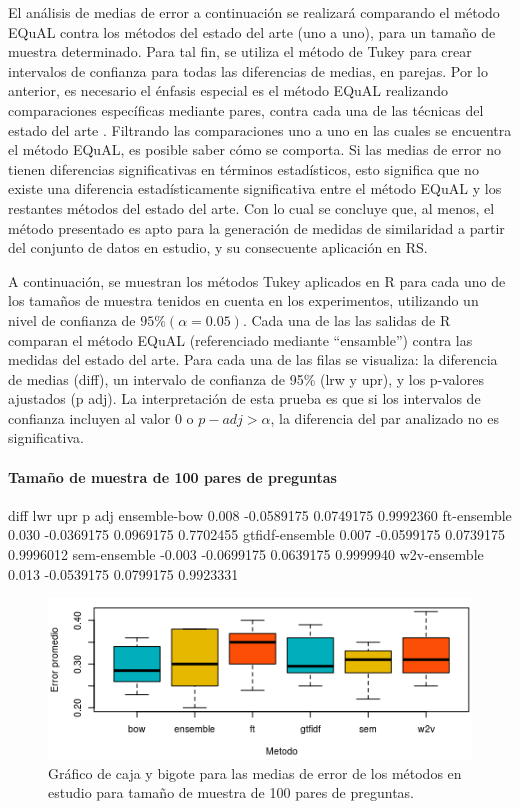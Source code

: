 \bigskip El análisis de medias de error a continuación se realizará comparando el método EQuAL contra los métodos del estado del arte (uno a uno), para un tamaño de muestra determinado. Para tal fin, se utiliza el método de Tukey para crear intervalos de confianza para todas las diferencias de medias, en parejas. Por lo anterior, es necesario el énfasis especial es el método EQuAL realizando comparaciones específicas mediante pares, contra cada una de las técnicas del estado del arte \citep{abdi2010tukey}. Filtrando las comparaciones uno a uno en las cuales se encuentra el método EQuAL, es posible saber cómo se comporta. Si las medias de error no tienen diferencias significativas en términos estadísticos, esto significa que no existe una diferencia estadísticamente significativa entre el método EQuAL y los restantes métodos del estado del arte. Con lo cual se concluye que, al menos, el método presentado es apto para la generación de medidas de similaridad a partir del conjunto de datos en estudio, y su consecuente aplicación en RS.

\bigskip A continuación, se muestran los métodos Tukey aplicados en R para cada uno de los tamaños de muestra tenidos en cuenta en los experimentos, utilizando un nivel de confianza de \(95\% (\alpha=0.05)\). Cada una de las las salidas de R comparan el método EQuAL (referenciado mediante “ensamble”) contra las medidas del estado del arte. Para cada una de las filas se visualiza: la diferencia de medias (diff), un intervalo de confianza de 95\% (lrw y upr), y los p-valores ajustados (p adj). La interpretación de esta prueba es que si los intervalos de confianza incluyen al valor \(0\) o \(p{-}adj > \alpha\), la diferencia del par analizado no es significativa.

\paragraph{Tamaño de muestra de 100 pares de preguntas}
\begin{rc}
                 diff        lwr       upr     p adj
ensemble-bow     0.008 -0.0589175 0.0749175 0.9992360
ft-ensemble      0.030 -0.0369175 0.0969175 0.7702455
gtfidf-ensemble  0.007 -0.0599175 0.0739175 0.9996012
sem-ensemble    -0.003 -0.0699175 0.0639175 0.9999940
w2v-ensemble     0.013 -0.0539175 0.0799175 0.9923331
\end{rc}

\begin{figure}[!]
	\centering
	\includegraphics[width=0.7\linewidth]{10_resultados/imagenes/anova_100}
	\caption{Gráfico de caja y bigote para las medias de error de los métodos en estudio para tamaño de muestra de 100 pares de preguntas.}
	\label{fig:anova100}
\end{figure}

